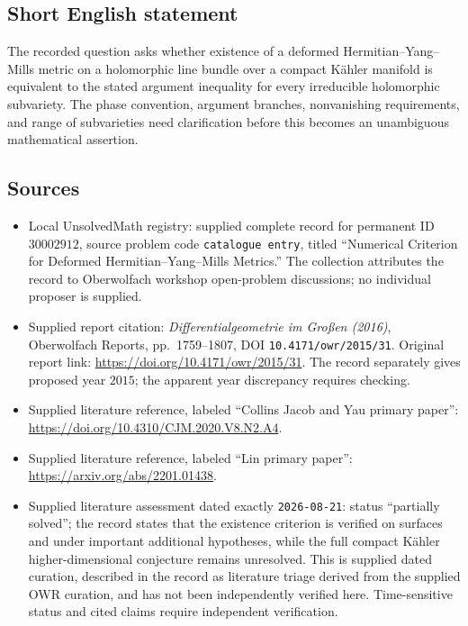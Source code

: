 \documentclass[11pt]{article}
\begin{document}
\subsection{Short English statement}
The recorded question asks whether existence of a deformed Hermitian--Yang--Mills metric on a holomorphic line bundle over a compact Kähler manifold is equivalent to the stated argument inequality for every irreducible holomorphic subvariety. The phase convention, argument branches, nonvanishing requirements, and range of subvarieties need clarification before this becomes an unambiguous mathematical assertion.
\subsection{Sources}
\begin{itemize}
\item Local UnsolvedMath registry: supplied complete record for permanent ID \(30002912\), source problem code \texttt{catalogue entry}, titled ``Numerical Criterion for Deformed Hermitian--Yang--Mills Metrics.'' The collection attributes the record to Oberwolfach workshop open-problem discussions; no individual proposer is supplied.
\item Supplied report citation: \emph{Differentialgeometrie im Großen (2016)}, Oberwolfach Reports, pp.~1759--1807, DOI \texttt{10.4171/owr/2015/31}. Original report link: \url{https://doi.org/10.4171/owr/2015/31}. The record separately gives proposed year \(2015\); the apparent year discrepancy requires checking.
\item Supplied literature reference, labeled ``Collins Jacob and Yau primary paper'': \url{https://doi.org/10.4310/CJM.2020.V8.N2.A4}.
\item Supplied literature reference, labeled ``Lin primary paper'': \url{https://arxiv.org/abs/2201.01438}.
\item Supplied literature assessment dated exactly \texttt{2026-08-21}: status ``partially solved''; the record states that the existence criterion is verified on surfaces and under important additional hypotheses, while the full compact Kähler higher-dimensional conjecture remains unresolved. This is supplied dated curation, described in the record as literature triage derived from the supplied OWR curation, and has not been independently verified here. Time-sensitive status and cited claims require independent verification.
\end{itemize}
\end{document}
